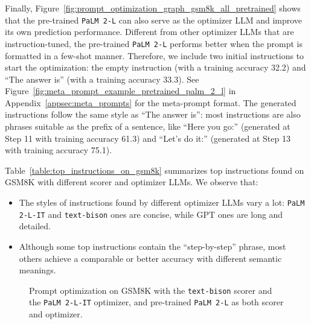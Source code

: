 Finally, Figure~\ref{fig:prompt_optimization_graph_gsm8k_all_pretrained} shows that the pre-trained \texttt{PaLM 2-L} can also serve as the optimizer LLM and improve its own prediction performance.
Different from other optimizer LLMs that are instruction-tuned, the pre-trained \texttt{PaLM 2-L} performs better when the prompt is formatted in a few-shot manner. Therefore, we include two initial instructions to start the optimization: the empty instruction (with a training accuracy 32.2) and ``The answer is'' (with a training accuracy 33.3).
See Figure~\ref{fig:meta_prompt_example_pretrained_palm_2_l} in Appendix~\ref{appsec:meta_prompts} for the meta-prompt format.
The generated instructions follow the same style as ``The answer is'': most instructions are also phrases suitable as the prefix of a sentence, like ``Here you go:'' (generated at Step 11 with training accuracy 61.3) and ``Let's do it:'' (generated at Step 13 with training accuracy 75.1).

Table~\ref{table:top_instructions_on_gsm8k} summarizes top instructions found on GSM8K with different scorer and optimizer LLMs.
We observe that:
\begin{itemize}[leftmargin=2em,topsep=0pt,partopsep=1ex,parsep=0ex]
\item The styles of instructions found by different optimizer LLMs vary a lot: \texttt{PaLM 2-L-IT} and \texttt{text-bison} ones are concise, while GPT ones are long and detailed.
\item Although some top instructions contain the ``step-by-step'' phrase, most others achieve a comparable or better accuracy with different semantic meanings.
\end{itemize}

\begin{figure}
\centering
{}
\hspace{.01\linewidth}

\caption{Prompt optimization on GSM8K with  the \texttt{text-bison} scorer and the \texttt{PaLM 2-L-IT} optimizer, and  pre-trained \texttt{PaLM 2-L} as both scorer and optimizer.
}
\label{fig:prompt_optimization_in_main_results_gsm8k_more}
\end{figure}

